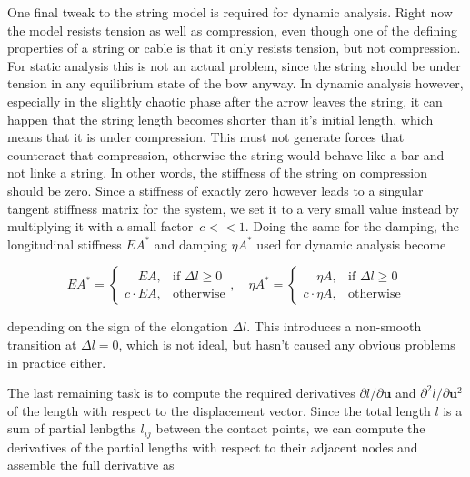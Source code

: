 One final tweak to the string model is required for dynamic analysis.
Right now the model resists tension as well as compression, even though one of the defining properties of a string or cable is that it only resists tension, but not compression.
For static analysis this is not an actual problem, since the string should be under tension in any equilibrium state of the bow anyway.
In dynamic analysis however, especially in the slightly chaotic phase after the arrow leaves the string, it can happen that the string length becomes shorter than it's initial length, which means that it is under compression.
This must not generate forces that counteract that compression, otherwise the string would behave like a bar and not linke a string.
In other words, the stiffness of the string on compression should be zero.
Since a stiffness of exactly zero however leads to a singular tangent stiffness matrix for the system, we set it to a very small value instead by multiplying it with a small factor~$c << 1$.
Doing the same for the damping, the longitudinal stiffness $EA^*$ and damping $\eta A^*$ used for dynamic analysis become

\begin{equation}
EA^* = \begin{cases}
    \phantom{c\cdot}EA, & \text{if $\Delta l \ge 0$} \\
    c\cdot EA, & \text{otherwise}
\end{cases}, \quad
\eta A^* = \begin{cases}
    \phantom{c\cdot}\eta A, & \text{if $\Delta l \ge 0$} \\
    c\cdot \eta A, & \text{otherwise}
\end{cases}
\end{equation}

depending on the sign of the elongation $\Delta l$.
This introduces a non-smooth transition at $\Delta l = 0$, which is not ideal, but hasn't caused any obvious problems in practice either.


The last remaining task is to compute the required derivatives $\partial l/\partial \boldsymbol{u}$ and $\partial^2 l/\partial \boldsymbol{u}^2$ of the length with respect to the displacement vector.
Since the total length $l$ is a sum of partial lenbgths $l_{ij}$ between the contact points, we can compute the derivatives of the partial lengths with respect to their adjacent nodes and assemble the full derivative as


